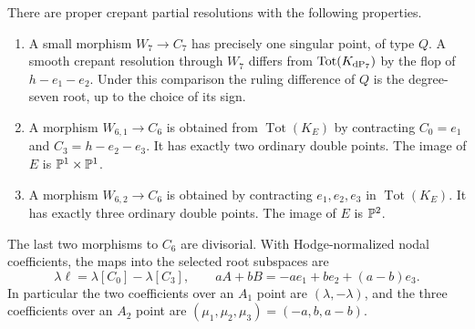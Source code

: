 \begin{proposition}\label{prop03:localmodels}
There are proper crepant partial resolutions with the following
properties.
\begin{enumerate}
\item A small morphism $W_7\to C_7$ has precisely one singular point,
of type $Q$.  A smooth crepant resolution through $W_7$ differs from
$\operatorname{Tot}(K_{\mathrm{dP}_7})$ by the flop of $h-e_1-e_2$.
Under this comparison the ruling difference of $Q$ is the degree-seven
root, up to the choice of its sign.
\item A morphism $W_{6,1}\to C_6$ is obtained from
$\operatorname{Tot}(K_E)$ by contracting
$C_0=e_1$ and $C_3=h-e_2-e_3$.  It has exactly two ordinary double
points.  The image of $E$ is $\mathbb{P}^1\times\mathbb{P}^1$.
\item A morphism $W_{6,2}\to C_6$ is obtained by contracting
$e_1,e_2,e_3$ in $\operatorname{Tot}(K_E)$.  It has exactly three
ordinary double points.  The image of $E$ is $\mathbb{P}^2$.
\end{enumerate}
The last two morphisms to $C_6$ are divisorial.  With Hodge-normalized
nodal coefficients, the maps into the selected root subspaces are
\begin{equation}\label{eq03:nodaltransfer}
 \lambda\ell=\lambda[C_0]-\lambda[C_3],\qquad
 aA+bB=-a e_1+b e_2+(a-b)e_3.
\end{equation}
In particular the two coefficients over an $A_1$ point are
$(\lambda,-\lambda)$, and the three coefficients over an $A_2$ point
are $(\mu_1,\mu_2,\mu_3)=(-a,b,a-b)$.
\end{proposition}

